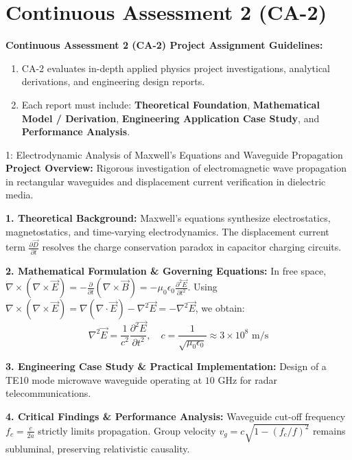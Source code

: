 \section{Continuous Assessment 2 (CA-2)}


\noindent
\textbf{Continuous Assessment 2 (CA-2) Project Assignment Guidelines:}
\begin{enumerate}[topsep=2pt,itemsep=1pt]
    \item CA-2 evaluates in-depth applied physics project investigations, analytical derivations, and engineering design reports.
    \item Each report must include: \textbf{Theoretical Foundation}, \textbf{Mathematical Model / Derivation}, \textbf{Engineering Application Case Study}, and \textbf{Performance Analysis}.
\end{enumerate}
\vspace{3mm}

\begin{projectbox}{1: Electrodynamic Analysis of Maxwell's Equations and Waveguide Propagation}
\textbf{Project Overview:} Rigorous investigation of electromagnetic wave propagation in rectangular waveguides and displacement current verification in dielectric media.

\textbf{1. Theoretical Background:}
Maxwell's equations synthesize electrostatics, magnetostatics, and time-varying electrodynamics. The displacement current term $\frac{\partial \vec{D}}{\partial t}$ resolves the charge conservation paradox in capacitor charging circuits.

\textbf{2. Mathematical Formulation \& Governing Equations:}
In free space, $\nabla \times (\nabla \times \vec{E}) = -\frac{\partial}{\partial t}(\nabla \times \vec{B}) = -\mu_0 \epsilon_0 \frac{\partial^2 \vec{E}}{\partial t^2}$.
Using $\nabla \times (\nabla \times \vec{E}) = \nabla(\nabla \cdot \vec{E}) - \nabla^2 \vec{E} = -\nabla^2 \vec{E}$, we obtain:
\begin{equation}
\nabla^2 \vec{E} = \frac{1}{c^2}\frac{\partial^2 \vec{E}}{\partial t^2}, \quad c = \frac{1}{\sqrt{\mu_0 \epsilon_0}} \approx 3 \times 10^8\text{ m/s}
\end{equation}

\textbf{3. Engineering Case Study \& Practical Implementation:}
Design of a TE10 mode microwave waveguide operating at $10\text{ GHz}$ for radar telecommunications.

\textbf{4. Critical Findings \& Performance Analysis:}
Waveguide cut-off frequency $f_c = \frac{c}{2a}$ strictly limits propagation. Group velocity $v_g = c\sqrt{1 - (f_c/f)^2}$ remains subluminal, preserving relativistic causality.
\end{projectbox}

